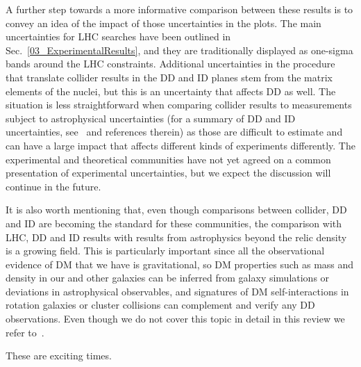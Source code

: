 A further step towards a more informative comparison between these results is to convey an idea of the impact of those uncertainties in the plots. 
The main uncertainties for LHC searches have been outlined in Sec.~\ref{03_ExperimentalResults}, and they are traditionally displayed as one-sigma bands around the LHC constraints. 
Additional uncertainties in the procedure that translate collider results in the DD and ID planes stem from the matrix elements of the nuclei, but this is an uncertainty that
affects DD as well. %
The situation is less straightforward when comparing collider results to measurements subject to astrophysical uncertainties (for a summary of DD and ID uncertainties, see~\cite{Feldstein:2014ufa,d300ef23986a49099715e661295a4d72} and references therein) as those are difficult to estimate and can have a large impact that affects different kinds of experiments differently. 
The experimental and theoretical communities have not yet agreed on a common presentation of experimental uncertainties, but we expect the discussion will continue in the future. 


It is also worth mentioning that, even though comparisons between collider, DD and ID are becoming the standard for these communities,
the comparison with LHC, DD and ID results with results from astrophysics beyond the relic density is a growing field. 
This is particularly important since all the observational evidence of DM that we have is gravitational,
so DM properties such as mass and density in our and other galaxies
can be inferred from galaxy simulations or deviations in astrophysical observables, 
and signatures of DM self-interactions in rotation galaxies or cluster collisions can complement and verify any DD 
observations. Even though we do not cover this topic in detail in this review we refer to~\cite{Buckley:2017ijx}. 



These are exciting times. %